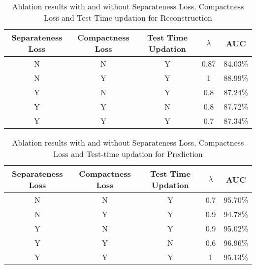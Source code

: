 \begin{table}[h]
\centering
\begin{tabular}{|c|c|c|c|c|}
\hline
Separateness Loss & Compactness Loss & Test Time Updation & $\lambda$                & AUC                          \\ \hline
N                 & N                & Y                  & 0.87                  & 84.03\%                      \\ \hline
N                 & Y                & Y                  & 1                     & 88.99\%                      \\ \hline
Y                 & N                & Y                  & 0.8                   & 87.24\%                      \\ \hline
Y                 & Y                & N                  & 0.8                   & 87.72\%                      \\ \hline
Y                 & Y                & Y                  & 0.7                   & \multicolumn{1}{l|}{87.34\%} \\ \hline
\end{tabular}
\caption{Ablation results with and without Separateness Loss, Compactness Loss and Test-Time updation for Reconstruction}
\label{tab:abl-recon}
\end{table}

\begin{table}[h]
\centering
\begin{tabular}{|c|c|c|c|c|}
\hline
Separateness Loss & Compactness Loss & Test Time Updation & $\lambda$                & AUC                          \\ \hline
N                 & N                & Y                  & 0.7                   & 95.70\%                      \\ \hline
N                 & Y                & Y                  & 0.9                   & 94.78\%                      \\ \hline
Y                 & N                & Y                  & 0.9                   & 95.02\%                      \\ \hline
Y                 & Y                & N                  & 0.6                   & 96.96\%                      \\ \hline
Y                 & Y                & Y                  & 1                     & \multicolumn{1}{l|}{95.13\%} \\ \hline
\end{tabular}
\caption{Ablation results with and without Separateness Loss, Compactness Loss and Test-time updation for Prediction}
\label{tab:abl-pred}
\end{table}

